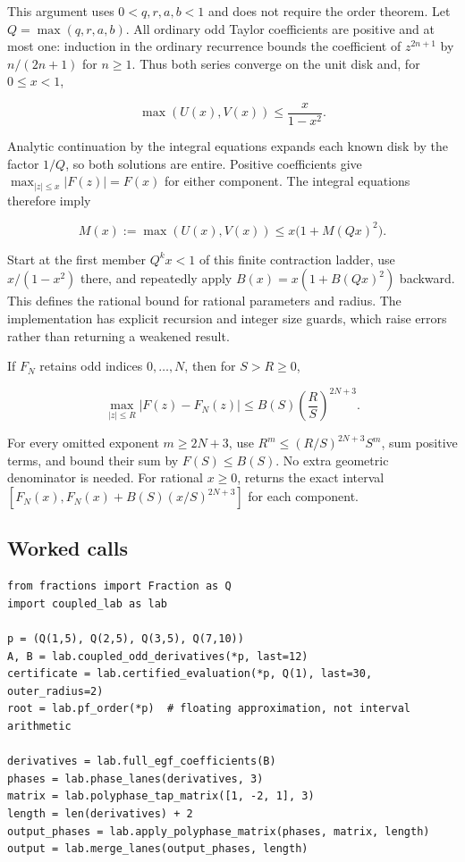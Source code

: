 This argument uses \(0<q,r,a,b<1\) and does not require the order
theorem. Let \(Q=\max(q,r,a,b)\). All ordinary odd Taylor coefficients
are positive and at most one: induction in the ordinary recurrence
bounds the coefficient of \(z^{2n+1}\) by \(n/(2n+1)\) for \(n\ge1\).
Thus both series converge on the unit disk and, for \(0\le x<1\),

\[
\max(U(x),V(x))\le \frac{x}{1-x^2}.
\]

Analytic continuation by the integral equations expands each known disk
by the factor \(1/Q\), so both solutions are entire. Positive
coefficients give \(\max_{|z|\le x}|F(z)|=F(x)\) for either component.
The integral equations therefore imply

\[
M(x):=\max(U(x),V(x))\le x\bigl(1+M(Qx)^2\bigr).
\]

Start at the first member \(Q^kx<1\) of this finite contraction ladder,
use \(x/(1-x^2)\) there, and repeatedly apply \(B(x)=x(1+B(Qx)^2)\)
backward. This defines the rational  bound for
rational parameters and radius. The implementation has explicit
recursion and integer size guards, which raise errors rather than
returning a weakened result.

If \(F_N\) retains odd indices \(0,\ldots,N\), then for \(S>R\ge0\),

\[
\max_{|z|\le R}|F(z)-F_N(z)|
\le B(S)\left(\frac RS\right)^{2N+3}.
\]

For every omitted exponent \(m\ge2N+3\), use \(R^m\le (R/S)^{2N+3}S^m\),
sum positive terms, and bound their sum by \(F(S)\le B(S)\). No extra
geometric denominator is needed. For rational \(x\ge0\),
 returns the exact interval
\([F_N(x),F_N(x)+B(S)(x/S)^{2N+3}]\) for each component.

\hypertarget{v11-coupled_lab_full-worked-calls}{%
\subsection{Worked calls}\label{v11-coupled_lab_full-worked-calls}}

\begin{verbatim}
from fractions import Fraction as Q
import coupled_lab as lab

p = (Q(1,5), Q(2,5), Q(3,5), Q(7,10))
A, B = lab.coupled_odd_derivatives(*p, last=12)
certificate = lab.certified_evaluation(*p, Q(1), last=30, outer_radius=2)
root = lab.pf_order(*p)  # floating approximation, not interval arithmetic

derivatives = lab.full_egf_coefficients(B)
phases = lab.phase_lanes(derivatives, 3)
matrix = lab.polyphase_tap_matrix([1, -2, 1], 3)
length = len(derivatives) + 2
output_phases = lab.apply_polyphase_matrix(phases, matrix, length)
output = lab.merge_lanes(output_phases, length)
\end{verbatim}

